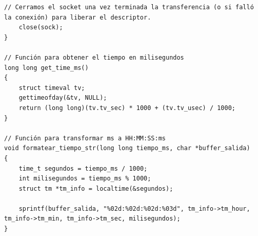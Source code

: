 \begin{lstlisting}[style=estiloC, caption={Archivo del Back-End (conexion P2P)}]
    // Cerramos el socket una vez terminada la transferencia (o si falló la conexión) para liberar el descriptor.
    close(sock);
}

// Función para obtener el tiempo en milisegundos
long long get_time_ms()
{
    struct timeval tv;
    gettimeofday(&tv, NULL);
    return (long long)(tv.tv_sec) * 1000 + (tv.tv_usec) / 1000;
}

// Función para transformar ms a HH:MM:SS:ms
void formatear_tiempo_str(long long tiempo_ms, char *buffer_salida)
{
    time_t segundos = tiempo_ms / 1000;
    int milisegundos = tiempo_ms % 1000;
    struct tm *tm_info = localtime(&segundos);

    sprintf(buffer_salida, "%02d:%02d:%02d:%03d", tm_info->tm_hour, tm_info->tm_min, tm_info->tm_sec, milisegundos);
}
\end{lstlisting}